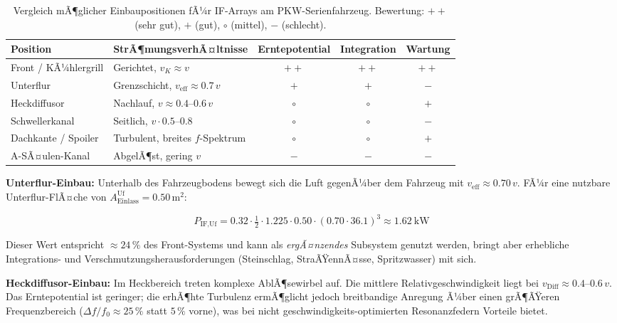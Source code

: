 ﻿\documentclass[12pt, a4paper]{report}
\theoremstyle{definition}
\theoremstyle{remark}
\newcommand{\Aeinlass}{A_{\text{Einlass}}}
\begin{document}
\begin{table}[H]
  \centering
  \caption{Vergleich mÃ¶glicher Einbaupositionen fÃ¼r IF-Arrays am PKW-Serienfahrzeug.
           Bewertung: $++$ (sehr gut), $+$ (gut), $\circ$ (mittel), $-$ (schlecht).}
  \label{tab:einbaupositionen}
  \begin{tabular}{l>{\raggedright\arraybackslash}p{4.2cm}ccc}
    \toprule
    Position & StrÃ¶mungsverhÃ¤ltnisse & Erntepotential & Integration & Wartung \\
    \midrule
    Front / KÃ¼hlergrill & Gerichtet, $v_K \approx v$ & $++$ & $++$ & $++$ \\
    Unterflur           & Grenzschicht, $v_{\text{eff}} \approx 0.7\,v$ & $+$  & $+$  & $-$  \\
    Heckdiffusor        & Nachlauf, $v \approx 0.4\text{--}0.6\,v$ & $\circ$ & $\circ$ & $+$ \\
    Schwellerkanal      & Seitlich, $v \cdot 0.5\text{--}0.8$ & $\circ$ & $\circ$ & $-$ \\
    Dachkante / Spoiler & Turbulent, breites $f$-Spektrum & $\circ$ & $\circ$ & $+$ \\
    A-SÃ¤ulen-Kanal      & AbgelÃ¶st, gering $v$ & $-$  & $-$  & $-$ \\
    \bottomrule
  \end{tabular}
\end{table}

\textbf{Unterflur-Einbau:}
Unterhalb des Fahrzeugbodens bewegt sich die Luft gegenÃ¼ber dem Fahrzeug
mit $v_{\text{eff}} \approx 0.70\,v$. FÃ¼r eine nutzbare Unterflur-FlÃ¤che
von $\Aeinlass^{\text{Uf}} = 0.50\,\text{m}^2$:

\begin{equation}
  P_{\text{IF,Uf}} = 0.32 \cdot \tfrac{1}{2} \cdot 1.225 \cdot 0.50 \cdot (0.70 \cdot 36.1)^3
  \approx \SI{1.62}{\kilo\watt}
  \label{eq:p_unterflur}
\end{equation}

Dieser Wert entspricht $\approx 24\,\%$ des Front-Systems und kann als
\emph{ergÃ¤nzendes} Subsystem genutzt werden, bringt aber erhebliche
Integrations- und Verschmutzungsherausforderungen (Steinschlag, StraÃŸennÃ¤sse,
Spritzwasser) mit sich.

\textbf{Heckdiffusor-Einbau:}
Im Heckbereich treten komplexe AblÃ¶sewirbel auf. Die mittlere
Relativgeschwindigkeit liegt bei $v_{\text{Diff}} \approx 0.4$--$0.6\,v$.
Das Erntepotential ist geringer; die erhÃ¶hte Turbulenz ermÃ¶glicht jedoch
breitbandige Anregung Ã¼ber einen grÃ¶ÃŸeren Frequenzbereich
($\Delta f / f_0 \approx 25\,\%$ statt $5\,\%$ vorne), was bei nicht
geschwindigkeits-optimierten Resonanzfedern Vorteile bietet.
\end{document}
